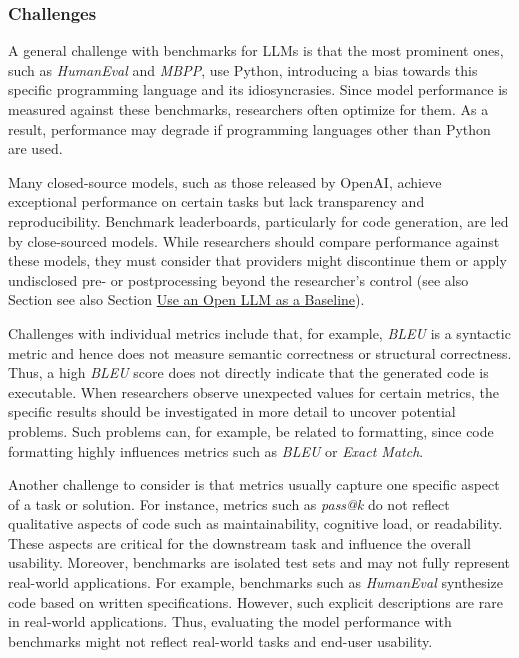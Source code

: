 
\subsubsection{Challenges}

A general challenge with benchmarks for LLMs is that the most prominent ones, such as \emph{HumanEval} and \emph{MBPP}, use Python, introducing a bias towards this specific programming language and its idiosyncrasies.
Since model performance is measured against these benchmarks, researchers often optimize for them.
As a result, performance may degrade if programming languages other than Python are used.

Many closed-source models, such as those released by OpenAI, achieve exceptional performance on certain tasks but lack transparency and reproducibility.
Benchmark leaderboards, particularly for code generation, are led by close-sourced models.
While researchers should compare performance against these models, they must consider that providers might discontinue them or apply undisclosed pre- or postprocessing beyond the researcher's control (see also Section see also Section \href{/guidelines/#use-an-open-llm-as-a-baseline}{Use an Open LLM as a Baseline}).

Challenges with individual metrics include that, for example, \emph{BLEU} is a syntactic metric and hence does not measure semantic correctness or structural correctness.
Thus, a high \emph{BLEU} score does not directly indicate that the generated code is executable.
When researchers observe unexpected values for certain metrics, the specific results should be investigated in more detail to uncover potential problems.
Such problems can, for example, be related to formatting, since code formatting highly influences metrics such as \emph{BLEU} or \emph{Exact Match}.

Another challenge to consider is that metrics usually capture one specific aspect of a task or solution.
For instance, metrics such as \emph{pass@k} do not reflect qualitative aspects of code such as maintainability, cognitive load, or readability.
These aspects are critical for the downstream task and influence the overall usability.
Moreover, benchmarks are isolated test sets and may not fully represent real-world applications.
For example, benchmarks such as \emph{HumanEval} synthesize code based on written specifications.
However, such explicit descriptions are rare in real-world applications.
Thus, evaluating the model performance with benchmarks might not reflect real-world tasks and end-user usability.


